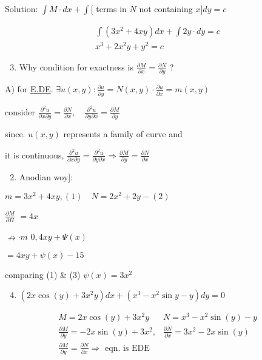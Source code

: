 Solution: $\int M \cdot d x+\int[$ terms in $N$ not containing $x] d y=c$

$$
	\begin{gathered}
		\int\left(3 x^2 +4 x y\right) d x+\int 2 y \cdot d y=c \\
		x^{3}+2 x^2 y+y^2=c
	\end{gathered}
$$

\begin{enumerate}
	\setcounter{enumi}{2}
	\item Why condition for exactness is $\frac{\partial M}{\partial x}=\frac{\partial N}{\partial y}$ ?
\end{enumerate}

A) for \href{http://E.DE}{E.DE}. $\exists u(x, y): \frac{\partial u}{\partial y}=N(x, y) \cdot \frac{\partial u}{\partial x}=m(x, y)$

consider $\frac{\partial^{2} u}{\partial x \partial y}=\frac{\partial N}{\partial x}, \quad \frac{\partial^{2} u}{\partial y \partial x}=\frac{\partial M}{\partial y}$

since. $u(x, y)$ represents a family of curve and

it is continuous, $\frac{\partial^{2} u}{\partial x \partial y}=\frac{\partial^{2} u}{\partial y \partial x} \Rightarrow \frac{\partial M}{\partial y}=\frac{\partial N}{\partial x}$

\begin{enumerate}
	\setcounter{enumi}{1}
	\item Anodian woy]:
\end{enumerate}

$m=3 x^2 +4 x y,(1) \quad N=2 x^2 +2 y-(2)$

$\frac{\partial M}{\partial H}$ $=4 x$

$\nrightarrow \cdot m$ $0,4 x y+\Psi(x)$

$=4 x y+\psi(x)-15$

comparing (1) \& (3) $\psi(x)=3 x^2 $

\begin{enumerate}
	\setcounter{enumi}{3}
	\item $\left(2 x \cos(y)+3 x^2 y\right) d x+\left(x^{3}-x^2 \sin y-y\right) d y=0$
\end{enumerate}

$$
	\begin{array}{ll}
		M=2 x \cos(y)+3 x^2 y                              & N=x^{3}-x^2 \sin(y)-y                            \\
		\frac{\partial M}{\partial y}=-2 x \sin(y)+3 x^2 , & \frac{\partial N}{\partial x}=3 x^2 -2 x \sin(y) \\
		\frac{\partial M}{\partial y}=\frac{\partial N}{\partial x} \Rightarrow \text{ eqn. is EDE }
	\end{array}
$$

